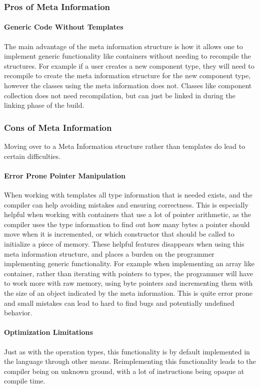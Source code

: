 \subsubsection{Pros of Meta Information}
\paragraph{Generic Code Without Templates}
The main advantage of the meta information structure is how it allows one to implement
generic functionality like containers without needing to recompile the structures.
For example if a user creates a new component type, they will need to recompile to create
the meta information structure for the new component type, however the classes using the
meta information does not. Classes like component collection does not need recompilation,
but can just be linked in during the linking phase of the build.

\subsubsection{Cons of Meta Information}
Moving over to a Meta Information structure rather than templates do lead to certain difficulties.

\paragraph{Error Prone Pointer Manipulation}
When working with templates all type information that is needed exists, and the compiler can help avoiding mistakes and ensuring correctness.
This is especially helpful when working with containers that use a lot of pointer arithmetic,
as the compiler uses the type information to find out how many bytes a pointer should move
when it is incremented, or which constructor that should be called to initialize a piece of memory.
These helpful features disappears when using this meta information structure, and places a burden on the programmer implementing generic functionality.
For example when implementing an array like container,
rather than iterating with pointers to types, the programmer will have to work more with raw memory,
using byte pointers and incrementing them with the size of an object indicated by the meta information.
This is quite error prone and small mistakes can lead to hard to find bugs and potentially undefined behavior.

\paragraph{Optimization Limitations}
Just as with the operation types, this functionality is by default implemented in the language
through other means. Reimplementing this functionality leads to the compiler being on unknown
ground, with a lot of instructions being opaque at compile time.
